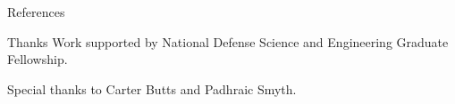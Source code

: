 \documentclass{beamer}
\begin{document}
\begin{frame}[allowframebreaks]{References}
\tiny


\end{frame}

\begin{frame}{Thanks}
Work supported by National Defense Science and Engineering Graduate
Fellowship.

\vspace{2cm}
Special thanks to Carter Butts and Padhraic Smyth.

\end{frame}
\end{document}
